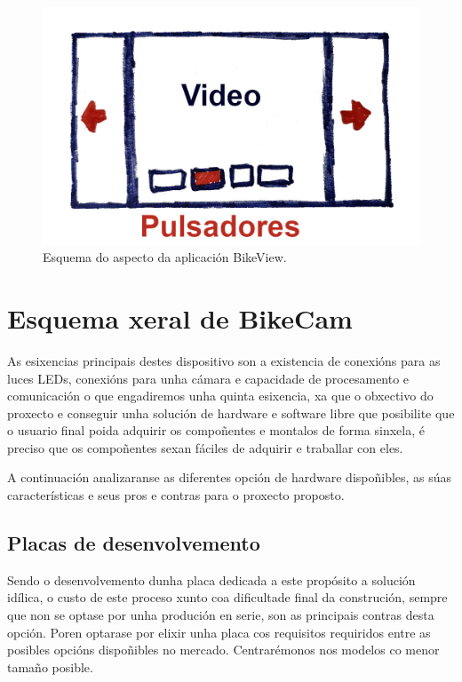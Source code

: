 \begin{figure}[tbp]
  \centering
  \includegraphics[scale=0.4]{imaxes/bikeview.jpg}
  \caption{Esquema do aspecto da aplicación BikeView.}
  \label{fig:bikeview}
\end{figure}

\section{Esquema xeral de BikeCam}


As esixencias principais destes dispositivo son a existencia de conexións para as luces LEDs, conexións para unha cámara e capacidade de procesamento e comunicación o que engadiremos unha quinta esixencia, xa que o obxectivo do proxecto e conseguir unha solución de hardware e software libre que posibilite que o usuario final poida adquirir os compoñentes e montalos de forma sinxela, é preciso que os compoñentes sexan fáciles de adquirir e traballar con eles.

A continuación analizaranse as diferentes opción de hardware dispoñibles, as súas características e seus pros e contras para o proxecto proposto.

\subsection{Placas de desenvolvemento}


Sendo o desenvolvemento dunha placa dedicada a este propósito a solución idílica, o custo de este proceso xunto coa dificultade final da construción, sempre que non se optase por unha produción en serie, son as principais contras desta opción. Poren optarase por elixir unha placa cos requisitos requiridos entre as posibles opcións dispoñibles no mercado. Centrarémonos nos modelos co menor tamaño posible.

